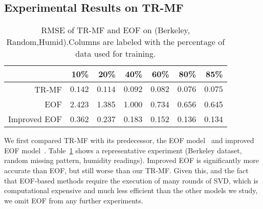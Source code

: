 \subsection{Experimental Results on TR-MF} \label{subsec:exp_basic}%



\begin{table}[h]
\setlength{\tabcolsep}{2pt}
\centering
\caption{RMSE of TR-MF and EOF on (Berkeley, Random,Humid).\newline  Columns are labeled with the percentage of data used for training.}
\label{table:trmf_eof}
\scriptsize
\begin{tabular}{ r | r r r r r r}
		&10\%	&20\%	&40\%	&60\%	&80\% &85\%\\ 
	 \hline
	 TR-MF &$\mathbf{0.142}$ &$\mathbf{0.114}$ &$\mathbf{0.092}$ &$\mathbf{0.082}$ &$\mathbf{0.076}$  &$\mathbf{0.075}$\\
     	 EOF &2.423 &1.385 &1.000 &0.734 &0.656 &0.645\\
     Improved EOF & 0.362 & 0.237 & 0.183 & 0.152 & 0.136 & 0.134\\
\end{tabular}
\end{table}


We first compared TR-MF with its predecessor, the EOF model~\cite{beckers2003eof} and improved EOF model~\cite{kondrashov2006spatio}.
Table~\ref{table:trmf_eof} shows a representative experiment (Berkeley dataset, random missing pattern, humidity readings).
Improved EOF is significantly more accurate than EOF, but still worse than our TR-MF.
Given this, and the fact that EOF-based methods require the execution of many rounds of SVD, 
which is computational expensive and much less efficient than the other models we study, 
we omit EOF from any further experiments.

